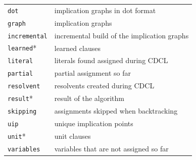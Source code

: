 \documentclass[11pt]{article}
\newcommand*{\p}[1]{\textup{\texttt{#1}}}
\begin{document}
\begin{center}
\begin{tabular}{|l|l|}
\p{dot}       &  implication graphs in dot format           \\
\p{graph}     &  implication graphs                         \\
\p{incremental}& incremental build of the implication graphs\\
\p{learned}*  &  learned clauses                            \\
\p{literal}   &  literals found assigned during CDCL        \\
\p{partial}   &  partial assignment so far                  \\
\p{resolvent} &  resolvents created during CDCL             \\
\p{result}*   &  result of the algorithm                    \\
\p{skipping}  &  assignments skipped when backtracking      \\
\p{uip}       &  unique implication points                  \\
\p{unit}*     &  unit clauses                               \\
\p{variables} &  variables that are not assigned so far     \\
\hline
\end{tabular}
\end{center}
\end{document}
